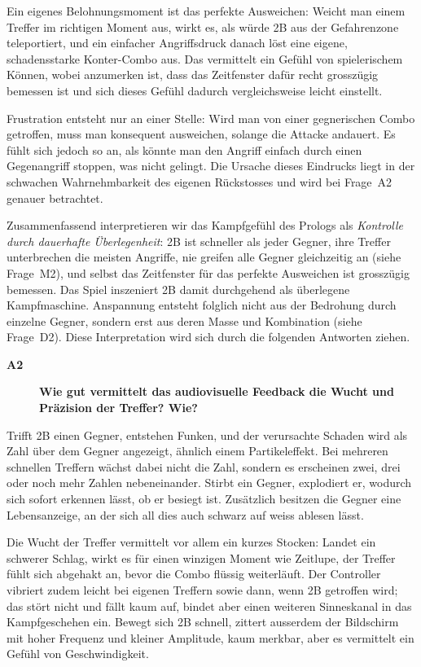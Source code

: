 \documentclass[../Main.tex]{subfiles}
\begin{document}
Ein eigenes Belohnungsmoment ist das perfekte Ausweichen: Weicht man einem Treffer im richtigen Moment aus, wirkt es, als würde 2B aus der Gefahrenzone teleportiert, und ein einfacher Angriffsdruck danach löst eine eigene, schadensstarke Konter-Combo aus. Das vermittelt ein Gefühl von spielerischem Können, wobei anzumerken ist, dass das Zeitfenster dafür recht grosszügig bemessen ist und sich dieses Gefühl dadurch vergleichsweise leicht einstellt.

Frustration entsteht nur an einer Stelle: Wird man von einer gegnerischen Combo getroffen, muss man konsequent ausweichen, solange die Attacke andauert. Es fühlt sich jedoch so an, als könnte man den Angriff einfach durch einen Gegenangriff stoppen, was nicht gelingt. Die Ursache dieses Eindrucks liegt in der schwachen Wahrnehmbarkeit des eigenen Rückstosses und wird bei Frage~A2 genauer betrachtet.

Zusammenfassend interpretieren wir das Kampfgefühl des Prologs als \textit{Kontrolle durch dauerhafte Überlegenheit}: 2B ist schneller als jeder Gegner, ihre Treffer unterbrechen die meisten Angriffe, nie greifen alle Gegner gleichzeitig an (siehe Frage~M2), und selbst das Zeitfenster für das perfekte Ausweichen ist grosszügig bemessen. Das Spiel inszeniert 2B damit durchgehend als überlegene Kampfmaschine. Anspannung entsteht folglich nicht aus der Bedrohung durch einzelne Gegner, sondern erst aus deren Masse und Kombination (siehe Frage~D2). Diese Interpretation wird sich durch die folgenden Antworten ziehen.

\begin{description}
  \item[\textbf{A2}] \textbf{Wie gut vermittelt das audiovisuelle Feedback die Wucht und Präzision der Treffer? Wie?}
\end{description}

Trifft 2B einen Gegner, entstehen Funken, und der verursachte Schaden wird als Zahl über dem Gegner angezeigt, ähnlich einem Partikeleffekt. Bei mehreren schnellen Treffern wächst dabei nicht die Zahl, sondern es erscheinen zwei, drei oder noch mehr Zahlen nebeneinander. Stirbt ein Gegner, explodiert er, wodurch sich sofort erkennen lässt, ob er besiegt ist. Zusätzlich besitzen die Gegner eine Lebensanzeige, an der sich all dies auch schwarz auf weiss ablesen lässt.

Die Wucht der Treffer vermittelt vor allem ein kurzes Stocken: Landet ein schwerer Schlag, wirkt es für einen winzigen Moment wie Zeitlupe, der Treffer fühlt sich abgehakt an, bevor die Combo flüssig weiterläuft. Der Controller vibriert zudem leicht bei eigenen Treffern sowie dann, wenn 2B getroffen wird; das stört nicht und fällt kaum auf, bindet aber einen weiteren Sinneskanal in das Kampfgeschehen ein. Bewegt sich 2B schnell, zittert ausserdem der Bildschirm mit hoher Frequenz und kleiner Amplitude, kaum merkbar, aber es vermittelt ein Gefühl von Geschwindigkeit.
\end{document}
